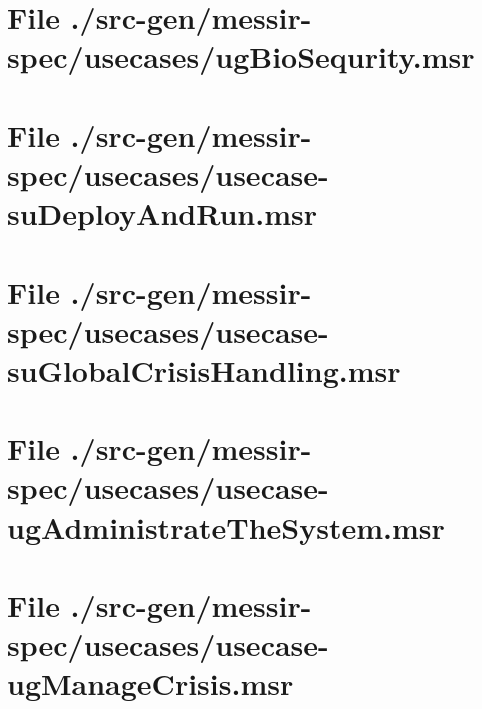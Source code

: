 \section[File /src-gen/messir-spec/usecases/ugBioSequrity.msr]{File ./src-gen/messir-spec/usecases/ugBioSequrity.msr}
\scriptsize

\normalsize
	
\section[File /src-gen/messir-spec/usecases/usecase-suDeployAndRun.msr]{File ./src-gen/messir-spec/usecases/usecase-suDeployAndRun.msr}
\scriptsize

\normalsize
	
\section[File /src-gen/messir-spec/usecases/usecase-suGlobalCrisisHandling.msr]{File ./src-gen/messir-spec/usecases/usecase-suGlobalCrisisHandling.msr}
\scriptsize

\normalsize
	
\section[File /src-gen/messir-spec/usecases/usecase-ugAdministrateTheSystem.msr]{File ./src-gen/messir-spec/usecases/usecase-ugAdministrateTheSystem.msr}
\scriptsize

\normalsize
	
\section[File /src-gen/messir-spec/usecases/usecase-ugManageCrisis.msr]{File ./src-gen/messir-spec/usecases/usecase-ugManageCrisis.msr}
\scriptsize

\normalsize
	
